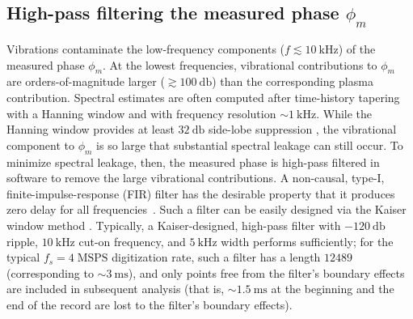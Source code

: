 \subsection{High-pass filtering the measured phase $\phi_m$}
\label{sec:Implementation:DataPreparation:high_pass_filtering}
Vibrations contaminate the low-frequency components
($f \lesssim \SI{10}{\kilo\hertz}$)
of the measured phase $\phi_m$.
At the lowest frequencies,
vibrational contributions to $\phi_m$
are orders-of-magnitude larger ($\gtrsim \SI{100}{\decibel}$)
than the corresponding plasma contribution.
Spectral estimates are often computed
after time-history tapering with a Hanning window and
with frequency resolution $\sim \SI{1}{\kilo\hertz}$.
While the Hanning window provides at least
$\SI{32}{\decibel}$ side-lobe suppression
\cite[Sec.~11.5.2.1]{bendat_and_piersol},
the vibrational component to $\phi_m$ is so large that
substantial spectral leakage can still occur.
To minimize spectral leakage, then,
the measured phase is high-pass filtered in software
to remove the large vibrational contributions.
A non-causal, type-I, finite-impulse-response (FIR) filter
has the desirable property that it produces zero delay
for all frequencies~\cite{kaiser_rsi77}\cite[Sec.~5.7.3]{oppenheim}.
Such a filter can be easily designed via
the Kaiser window method
\cite[Sec.~7.5.3]{oppenheim}\cite{scipy_kaiser_window}.
Typically, a Kaiser-designed, high-pass filter with
$\SI{-120}{\decibel}$ ripple,
$\SI{10}{\kilo\hertz}$ cut-on frequency, and
$\SI{5}{\kilo\hertz}$ width
performs sufficiently;
for the typical $f_s = 4 \; \text{MSPS}$ digitization rate,
such a filter has a length $12489$
(corresponding to $\sim \SI{3}{\milli\second}$), and
only points free from the filter's boundary effects
are included in subsequent analysis
(that is, $\sim \SI{1.5}{\milli\second}$
at the beginning and the end of the record
are lost to the filter's boundary effects).


